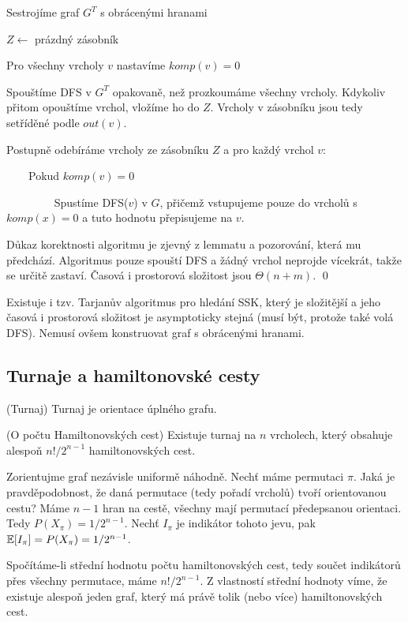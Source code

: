 \begin{enumerate*}
\item Sestrojíme graf $G^T$ s obrácenými hranami
\item $Z \leftarrow$ prázdný zásobník
\item Pro všechny vrcholy $v$ nastavíme $komp(v) = 0$
\item Spouštíme DFS v $G^T$ opakovaně, než prozkoumáme všechny vrcholy. Kdykoliv přitom opouštíme vrchol, vložíme ho do $Z$. Vrcholy v zásobníku jsou tedy setříděné podle $out(v)$.
\item Postupně odebíráme vrcholy ze zásobníku $Z$ a pro každý vrchol $v$:
\item $\qquad$Pokud $komp(v) = 0$
\leftmargin=6cm
\indent
\item $\qquad\qquad$ Spustíme DFS($v$) v $G$, přičemž vstupujeme pouze do vrcholů s $komp(x) = 0$ a tuto hodnotu přepisujeme na $v$.
\end{enumerate*}

\dk Důkaz korektnosti algoritmu je zjevný z lemmatu a pozorování, která mu předchází. Algoritmus pouze spouští DFS a žádný vrchol neprojde vícekrát, takže se určitě zastaví. Časová i prostorová složitost jsou $\Theta(n+m)$.
\qed

Existuje i tzv. Tarjanův algoritmus pro hledání SSK, který je složitější a jeho časová i prostorová složitost je asymptoticky stejná (musí být, protože také volá DFS). Nemusí ovšem konstruovat graf s obrácenými hranami.

\subsection{Turnaje a hamiltonovské cesty}

\df (Turnaj) Turnaj je orientace úplného grafu.

\vt (O počtu Hamiltonovských cest) Existuje turnaj na $n$ vrcholech, který
obsahuje alespoň $n!/2^{n-1}$ hamiltonovských cest.

\dk Zorientujme graf nezávisle uniformě náhodně. Nechť máme permutaci $\pi$.
Jaká je pravděpodobnost, že daná permutace (tedy pořadí vrcholů) tvoří
orientovanou cestu? Máme $n-1$ hran na cestě, všechny mají permutací
předepsanou orientaci. Tedy $P(X_\pi)= 1/2^{n-1}$. Nechť $I_\pi$ je indikátor
tohoto jevu, pak $\mathbb{E}[I_\pi] = P(X_\pi) = 1/2^{n-1}$.

Spočítáme-li střední hodnotu počtu hamiltonovských cest, tedy součet indikátorů
přes všechny permutace, máme $n!/2^{n-1}$. Z vlastností střední hodnoty víme,
že existuje alespoň jeden graf, který má právě tolik (nebo více) hamiltonovských
cest.

